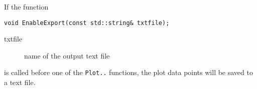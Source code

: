 If the function
\begin{lstlisting}
void EnableExport(const std::string& txtfile);
\end{lstlisting} 
\begin{description}
  \item[txtfile] name of the output text file
\end{description}
is called before one of the \texttt{Plot..} functions, the 
plot data points will be saved to a text file.

%
